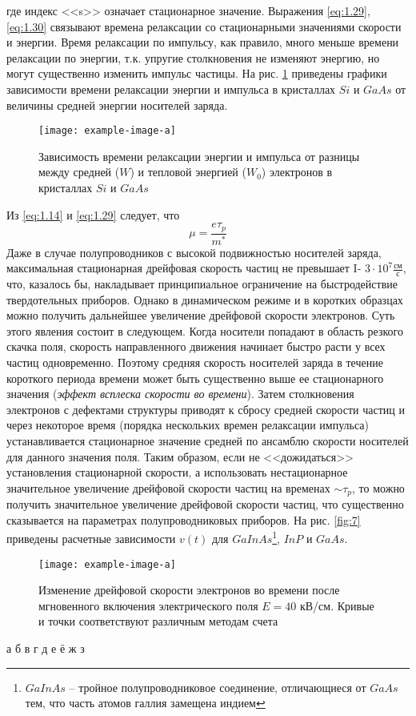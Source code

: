 где индекс <<s>> означает стационарное значение. Выражения \eqref{eq:1.29}, \eqref{eq:1.30}
связывают времена релаксации со стационарными значениями скорости и энергии.
Время релаксации по импульсу, как правило, много меньше времени релаксации
по энергии, т.к. упругие столкновения не изменяют энергию, но могут существенно изменить импульс частицы. На рис. \ref{fig:5} приведены графики зависимости
времени релаксации энергии и импульса в кристаллах $Si$ и $GaAs$ от величины
средней энергии носителей заряда.
\begin{figure}[h!]
	\centering
	\texttt{[image: example-image-a]}
	\caption{Зависимость времени релаксации энергии и импульса от разницы между средней 
	($W$) и тепловой энергией ($W_0$) электронов в кристаллах $Si$ и $GaAs$}
	\label{fig:5}
\end{figure}
Из \eqref{eq:1.14} и \eqref{eq:1.29} следует, что 
\begin{equation}
\label{eq:1.31}
	\mu =\frac{e \tau_p}{m^*}
\end{equation}
Даже в случае полупроводников с высокой подвижностью носителей заряда,
максимальная стационарная дрейфовая скорость частиц не превышает I-
$3\cdot 10^7\frac{\text{см}}{\text{с}}$, что, казалось бы, накладывает принципиальное ограничение на быстродействие твердотельных приборов. Однако в динамическом режиме и в коротких образцах можно получить дальнейшее увеличение дрейфовой скорости электронов. Суть этого явления состоит в следующем. Когда носители попадают в
область резкого скачка поля, скорость направленного движения начинает быстро
расти у всех частиц одновременно. Поэтому средняя скорость носителей заряда в
течение короткого периода времени может быть существенно выше ее стационарного значения (\textit{эффект всплеска скорости во времени}). Затем столкновения электронов с дефектами структуры приводят к сбросу средней скорости частиц и через некоторое время (порядка нескольких времен релаксации импульса) устанавливается стационарное значение средней по ансамблю скорости носителей для данного значения поля. Таким образом, если не <<дожидаться>>
установления стационарной скорости, а использовать нестационарное значительное увеличение дрейфовой скорости частиц на временах $\sim \tau_p$, то можно получить значительное увеличение дрейфовой скорости частиц, что существенно сказывается на параметрах полупроводниковых приборов. На рис. \ref{fig:7} приведены расчетные зависимости $v(t)$ для 
$GaInAs$\footnote{$GaInAs$ -- тройное полупроводниковое соединение, отличающиеся от $GaAs$ тем, что часть атомов галлия замещена индием}, $InP$  и $GaAs$.
\begin{figure}[h!]
	\centering
	\texttt{[image: example-image-a]}
	\caption{Изменение дрейфовой скорости электронов во времени после мгновенного включения электрического поля $E=40$ кВ/см. Кривые и точки соответствуют различным методам счета \cite{lit6}}
	\label{fig:figure1}
\end{figure}



\begin{thebibliography}{}
	 а
	 б
	 в
	 г
	 д
	 е
	 ё
	 ж
	 з
\end{thebibliography}


